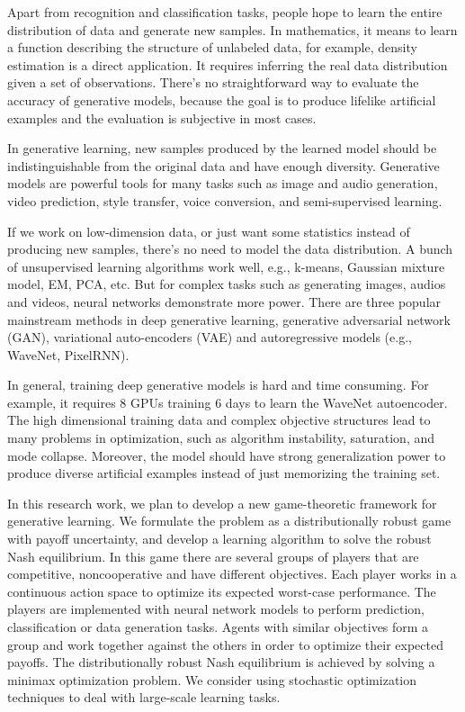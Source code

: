 \documentclass{article}
\begin{document}
Apart from recognition and classification tasks, people hope to learn the entire distribution of data and generate new samples. In mathematics, it means to learn a function describing the structure of unlabeled data, for example, density estimation is a direct application. It requires inferring the real data distribution given a set of observations. There's no straightforward way to evaluate the accuracy of generative models, because the goal is to produce lifelike artificial examples and the evaluation is subjective in most cases.

In generative learning, new samples produced by the learned model should be indistinguishable from the original data and have enough diversity. Generative models are powerful tools for many tasks such as image and audio generation, video prediction, style transfer, voice conversion, and semi-supervised learning.

If we work on low-dimension data, or just want some statistics instead of producing new samples, there's no need to model the data distribution. A bunch of unsupervised learning algorithms work well, e.g., k-means, Gaussian mixture model, EM, PCA, etc. But for complex tasks such as generating images, audios and videos, neural networks demonstrate more power. There are three popular mainstream methods in deep generative learning, generative adversarial network (GAN), variational auto-encoders (VAE) and autoregressive models (e.g., WaveNet, PixelRNN).

In general, training deep generative models is hard and time consuming. For example, it requires 8 GPUs training 6 days to learn the WaveNet autoencoder. The high dimensional training data and complex objective structures lead to many problems in optimization, such as algorithm instability, saturation, and mode collapse. Moreover, the model should have strong generalization power to produce diverse artificial examples instead of just memorizing the training set.

In this research work, we plan to develop a new game-theoretic framework for generative learning. We formulate the problem as a distributionally robust game with payoff uncertainty, and develop a learning algorithm to solve the robust Nash equilibrium. In this game there are several groups of players that are competitive, noncooperative and have different objectives. Each player works in a continuous action space to optimize its expected worst-case performance. The players are implemented with neural network models to perform prediction, classification or data generation tasks. Agents with similar objectives form a group and work together against the others in order to optimize their expected payoffs. The distributionally robust Nash equilibrium is achieved by solving a minimax optimization problem. We consider using stochastic optimization techniques to deal with large-scale learning tasks.
\end{document}
